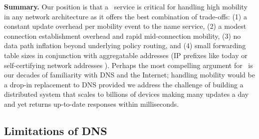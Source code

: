 
{\bf{Summary.}} Our position is that a \logcen\ service is critical for handling high mobility in any network architecture as it offers the best combination of trade-offs: (1) a constant update overhead per mobility event to the name service, (2) a modest connection establishment overhead and rapid mid-connection mobility, (3) no data path inflation beyond underlying policy routing, and (4) small forwarding table sizes in conjunction with aggregatable addresses (IP prefixes like today or self-certifying network addresses \cite{MobilityFirst-UMASS,XIA}). Perhaps the most compelling argument for  \logcen\ is our decades of familiarity with DNS and the Internet; handling mobility would be a drop-in replacement to DNS provided we address the challenge of building a distributed system that scales to billions of devices making many updates a day and yet returns up-to-date responses within milliseconds. %

\subsection{Limitations of DNS}
\label{sec:whyNotDNS}


